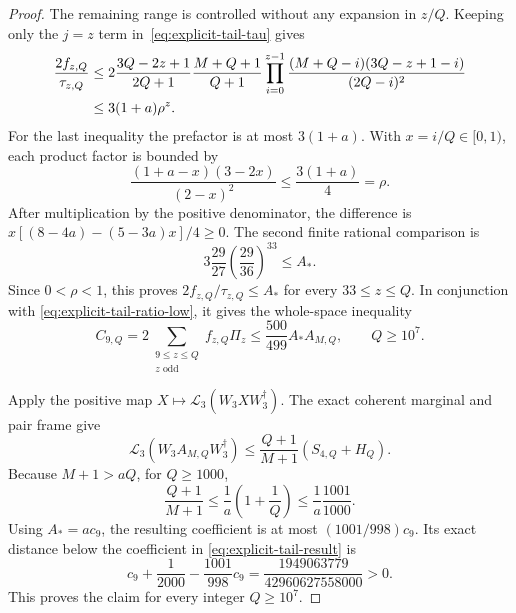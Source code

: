 \documentclass[11pt]{article}
\begin{document}
\begin{proof}
The remaining range is controlled without any expansion in $z/Q$.
Keeping only the $j=z$ term in~\eqref{eq:explicit-tail-tau} gives
\begin{align}
 \frac{2f_{z,Q}}{\tau_{z,Q}}
 &\le2\frac{3Q-2z+1}{2Q+1}\frac{M+Q+1}{Q+1}
 \prod_{i=0}^{z-1}
 \frac{(M+Q-i)(3Q-z+1-i)}{(2Q-i)^2}\notag\\
 &\le3(1+a)\rho^z.\label{eq:explicit-tail-coarse}
\end{align}
For the last inequality the prefactor is at most $3(1+a)$.
With $x=i/Q\in[0,1)$, each product factor is bounded by
\begin{equation}
 \frac{(1+a-x)(3-2x)}{(2-x)^2}\le\frac{3(1+a)}4=\rho.
\end{equation}
After multiplication by the positive denominator, the difference is
$x[(8-4a)-(5-3a)x]/4\ge0$. The second finite rational comparison is
\begin{equation}\label{eq:explicit-tail-coarse-check}
 3\frac{29}{27}\left(\frac{29}{36}\right)^{33}\le A_*.
\end{equation}
Since $0<\rho<1$, this proves $2f_{z,Q}/\tau_{z,Q}\le A_*$ for
every $33\le z\le Q$. In conjunction with
\eqref{eq:explicit-tail-ratio-low}, it gives the whole-space inequality
\begin{equation}
 C_{9,Q}=2\sum_{\substack{9\le z\le Q\\z\text{ odd}}}
                       f_{z,Q}\Pi_z
 \le\frac{500}{499}A_* A_{M,Q},\qquad Q\ge10^7.
\end{equation}

Apply the positive map $X\mapsto\mathcal L_3(W_3XW_3^\dagger)$.
The exact coherent marginal and pair frame give
\begin{equation}
 \mathcal L_3(W_3A_{M,Q}W_3^\dagger)
 \le\frac{Q+1}{M+1}(S_{4,Q}+H_Q).
\end{equation}
Because $M+1>aQ$, for $Q\ge1000$,
\begin{equation}
 \frac{Q+1}{M+1}\le\frac1a\left(1+\frac1Q\right)
                    \le\frac1a\frac{1001}{1000}.
\end{equation}
Using $A_*=ac_9$, the resulting coefficient is at most
$(1001/998)c_9$. Its exact distance below the coefficient in
\eqref{eq:explicit-tail-result} is
\begin{equation}\label{eq:explicit-tail-budget-check}
 c_9+\frac1{2000}-\frac{1001}{998}c_9
 =\frac{1949063779}{42960627558000}>0.
\end{equation}
This proves the claim for every integer $Q\ge10^7$.
\end{proof}
\end{document}
